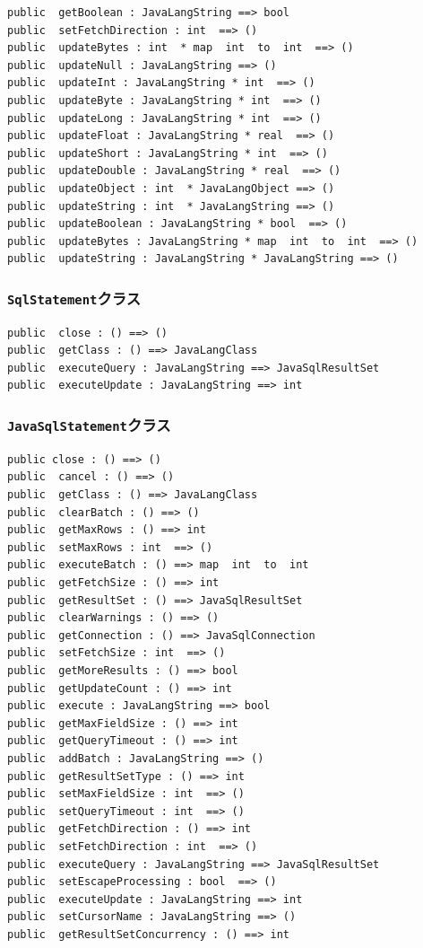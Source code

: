 \documentclass[\pformat,12pt]{jarticle}
\begin{document}
\begin{small}
\begin{verbatim}
public  getBoolean : JavaLangString ==> bool
public  setFetchDirection : int  ==> ()
public  updateBytes : int  * map  int  to  int  ==> ()
public  updateNull : JavaLangString ==> ()
public  updateInt : JavaLangString * int  ==> ()
public  updateByte : JavaLangString * int  ==> ()
public  updateLong : JavaLangString * int  ==> ()
public  updateFloat : JavaLangString * real  ==> ()
public  updateShort : JavaLangString * int  ==> ()
public  updateDouble : JavaLangString * real  ==> ()
public  updateObject : int  * JavaLangObject ==> ()
public  updateString : int  * JavaLangString ==> ()
public  updateBoolean : JavaLangString * bool  ==> ()
public  updateBytes : JavaLangString * map  int  to  int  ==> ()
public  updateString : JavaLangString * JavaLangString ==> ()
\end{verbatim}
\end{small}

\subsubsection{\texttt{SqlStatement}クラス}
\begin{small}
\begin{verbatim}
public  close : () ==> ()
public  getClass : () ==> JavaLangClass
public  executeQuery : JavaLangString ==> JavaSqlResultSet
public  executeUpdate : JavaLangString ==> int
\end{verbatim}
\end{small}

\subsubsection{\texttt{JavaSqlStatement}クラス}
\begin{small}
\begin{verbatim}
public close : () ==> ()
public  cancel : () ==> ()
public  getClass : () ==> JavaLangClass
public  clearBatch : () ==> ()
public  getMaxRows : () ==> int
public  setMaxRows : int  ==> ()
public  executeBatch : () ==> map  int  to  int
public  getFetchSize : () ==> int
public  getResultSet : () ==> JavaSqlResultSet
public  clearWarnings : () ==> ()
public  getConnection : () ==> JavaSqlConnection
public  setFetchSize : int  ==> ()
public  getMoreResults : () ==> bool
public  getUpdateCount : () ==> int
public  execute : JavaLangString ==> bool
public  getMaxFieldSize : () ==> int
public  getQueryTimeout : () ==> int
public  addBatch : JavaLangString ==> ()
public  getResultSetType : () ==> int
public  setMaxFieldSize : int  ==> ()
public  setQueryTimeout : int  ==> ()
public  getFetchDirection : () ==> int
public  setFetchDirection : int  ==> ()
public  executeQuery : JavaLangString ==> JavaSqlResultSet
public  setEscapeProcessing : bool  ==> ()
public  executeUpdate : JavaLangString ==> int
public  setCursorName : JavaLangString ==> ()
public  getResultSetConcurrency : () ==> int
\end{verbatim}
\end{small}

\appendix

\newpage



\newpage
{}
\printindex
\end{document}
